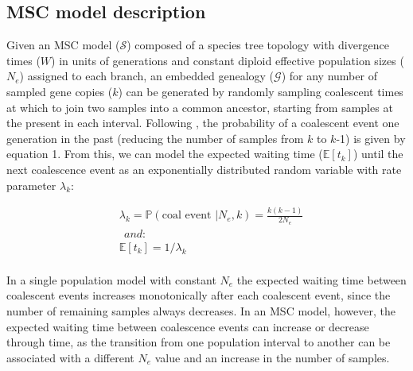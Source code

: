 \documentclass[11pt]{article}
\begin{document}
\subsection{MSC model description}
Given an MSC model ($\mathcal{S}$) composed of a species tree topology with divergence
times ($W$) in units of generations and constant diploid effective population 
sizes ($N_e$) assigned to each branch, an embedded genealogy ($\mathcal{G}$) for 
any number of sampled gene copies ($k$) can be generated
by randomly sampling coalescent times at which to join two samples into a 
common ancestor, starting from samples at the present in each interval.
% 
% 
% 
Following \citet{kingman1982coalescent}, the probability of a 
coalescent event one generation in the past (reducing the 
number of samples from $k$ to $k$-1) %
is given by equation 1. From this, we can model the expected 
waiting time ($\mathbb{E}[t_k]$) until the next coalescence event as an 
exponentially distributed random variable with rate parameter $\lambda_k$:

\begin{equation}
\begin{aligned}
	&\lambda_k = \mathbb{P}(\text{coal~event~} | N_e,k) = \frac{k(k-1)}{2N_e}
	\\
	&~~and:
	\\[0.15cm]
	&\mathbb{E}[t_k] = 1 / \lambda_k
	\\[0.15cm]	
\end{aligned}
\end{equation}

\noindent In a single population model
with constant $N_e$ the expected waiting time between coalescent events 
increases monotonically after each coalescent event, since the number of
remaining samples always decreases. In an MSC model, 
however, the expected waiting time between coalescence events can increase or 
decrease through time, as the transition from one population interval to another 
can be associated with a different $N_e$ value and an increase in the number 
of samples.
\end{document}
